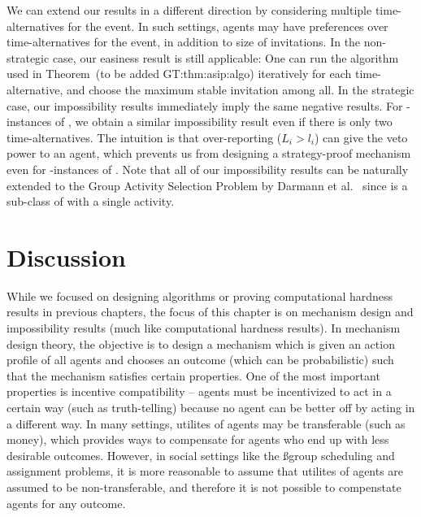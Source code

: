 We can extend our results in a different direction by considering multiple time-alternatives for the event. In such settings, agents may have preferences over time-alternatives for the event, in addition to size of invitations.   
In the non-strategic case, our easiness result is still applicable: One can run the algorithm used in Theorem~(to be added  GT:thm:asip:algo) iteratively for each time-alternative, and choose the maximum stable invitation among all.
In the strategic case, our impossibility results immediately imply the same negative results. 
For \INC-instances of \ASIP, we obtain a similar impossibility result even if there is only two time-alternatives. The intuition is that over-reporting ($L_i > l_i$) can give the veto power to an agent, which prevents us from designing a strategy-proof mechanism even for \INC-instances of \ASIP. Note that all of our impossibility results can be naturally extended to the Group Activity Selection Problem by Darmann et al.~\cite{GASP12WINE} since \ASIPs is a sub-class of \GASPs with a single activity.




\section{Discussion}

While we focused on designing algorithms or proving computational hardness results in previous chapters, the focus of this chapter is on mechanism design and impossibility results (much like computational hardness results). In mechanism design theory, the objective is to design a mechanism which is given an action profile of all agents and chooses an outcome (which can be probabilistic) such that the mechanism satisfies certain properties. One of the most important properties is incentive compatibility -- agents must be incentivized to act in a certain way (such as truth-telling) because no agent can be better off by acting in a different way. In many settings, utilites of agents may be transferable (such as money), which provides ways to compensate for agents who end up with less desirable outcomes. However, in social settings like the ßgroup scheduling and assignment problems, it is more reasonable to assume that utilites of agents are assumed to be non-transferable, and therefore it is not possible to compenstate agents for any outcome. 
